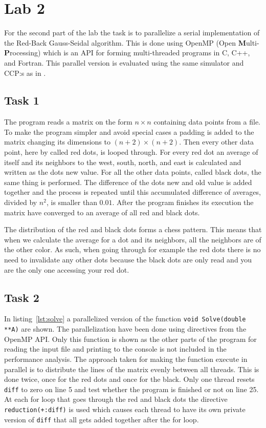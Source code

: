 \section{Lab 2}
\label{sec:lab2}
For the second part of the lab the task is to parallelize a serial implementation of the Red-Back Gauss-Seidal algorithm. This is done using OpenMP (Open \textbf Multi-\textbf Processing) which is an API for forming multi-threaded programs in C, C++, and Fortran. This parallel version is evaluated using the same simulator and CCP:s as in . 

\subsection{Task 1}
The program reads a matrix on the form $n \times n$ containing data points from a file. To make the program simpler and avoid special cases a padding is added to the matrix changing its dimensions to $(n+2) \times (n+2)$. Then every other data point, here by called red dots, is looped through. For every red dot an average of itself and its neighbors to the west, south, north, and east is calculated and written as the dots new value. For all the other data points, called black dots, the same thing is performed. The difference of the dots new and old value is added together and the process is repeated until this accumulated difference of averages, divided by $n^2$, is smaller than $0.01$. After the program finishes its execution the matrix have converged to an average of all red and black dots.

The distribution of the red and black dots forms a chess pattern. This means that when we calculate the average for a dot and its neighbors, all the neighbors are of the other color. As such, when going through for example the red dots there is no need to invalidate any other dots because the black dots are only read and you are the only one accessing your red dot.

\subsection{Task 2}
\label{subsec:lab2:task2}
In listing~\ref{lst:solve} a parallelized version of the function \texttt{void Solve(double **A)} are shown. The parallelization have been done using directives from the OpenMP API. Only this function is shown as the other parts of the program for reading the input file and printing to the console is not included in the performance analysis. The approach taken for making the function execute in parallel is to distribute the lines of the matrix evenly between all threads. This is done twice, once for the red dots and once for the black. Only one thread resets \texttt{diff} to zero on line 5 and test whether the program is finished or not on line 25. At each for loop that goes through the red and black dots the directive \texttt{reduction(+:diff)} is used which causes each thread to have its own private version of \texttt{diff} that all gets added together after the for loop.

